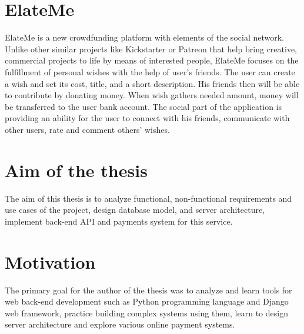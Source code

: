 \section{ElateMe}
ElateMe is a new crowdfunding platform with elements of the social network. Unlike other similar projects like
Kickstarter or Patreon that help bring creative, commercial projects to life by means of interested people, ElateMe
focuses on the fulfillment of personal wishes with the help of user’s friends. The user can create a wish and set its
cost, title, and a short description. His friends then will be able to contribute by donating money. When wish gathers
needed amount, money will be transferred to the user bank account. The social part of the application is providing an
ability for the user to connect with his friends, communicate with other users, rate and comment others’ wishes.

\section{Aim of the thesis}
The aim of this thesis is to analyze functional, non-functional requirements and use cases of the project, design
database model, and server architecture, implement back-end \ac{API} and payments system for this service.

\section{Motivation}
The primary goal for the author of the thesis was to analyze and learn tools for web back-end development such as Python
programming language and Django web framework, practice building complex systems using them, learn to design server
architecture and explore various online payment systems.
